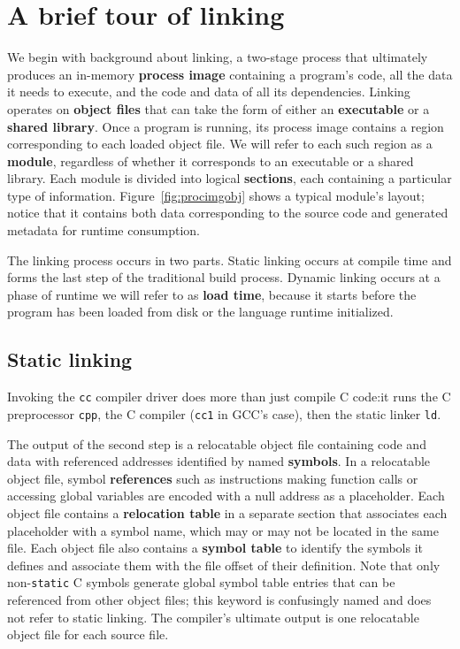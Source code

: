 \section{A brief tour of linking}
\label{sec:libgotcha:link}

We begin with background about linking, a two-stage process that ultimately produces
an in-memory \textbf{process image} containing a program's code, all the data it
needs to execute, and the code and data of all its dependencies.  Linking operates on
\textbf{object files} that can take the form of either an \textbf{executable} or a
\textbf{shared library}.  Once a program is running, its process image contains a
region corresponding to each loaded object file.  We will refer to each such region as
a \textbf{module}, regardless of whether it corresponds to an executable or a shared
library.  Each module is divided into logical \textbf{sections}, each containing a
particular type of information.  Figure~\ref{fig:procimgobj} shows a typical module's
layout; notice that it contains both data corresponding to the source code and
generated metadata for runtime consumption.

The linking process occurs in two parts.  Static linking occurs at compile time and
forms the last step of the traditional build process.  Dynamic linking occurs at a
phase of runtime we will refer to as \textbf{load time}, because it starts before the
program has been loaded from disk or the language runtime initialized.


\subsection{Static linking}

Invoking the \texttt{cc} compiler driver does more than just compile C code:\@ it
runs the C preprocessor \texttt{cpp}, the C compiler (\texttt{cc1} in GCC's case),
then the static linker \texttt{ld}.

The output of the second step is a relocatable object file containing code and data
with referenced addresses identified by named \textbf{symbols}.  In a relocatable
object file, symbol \textbf{references} such as instructions making function calls
or accessing global variables are encoded with a null address as a placeholder.  Each
object file contains a \textbf{relocation table} in a separate section that
associates each placeholder with a symbol name, which may or may not be located in
the same file.  Each object file also contains a \textbf{symbol table} to identify
the symbols it defines and associate them with the file offset of their definition.
Note that only non-\texttt{static} C symbols generate global symbol table entries
that can be referenced from other object files; this keyword is confusingly named and
does not refer to static linking.  The compiler's ultimate output is one relocatable
object file for each source file.

